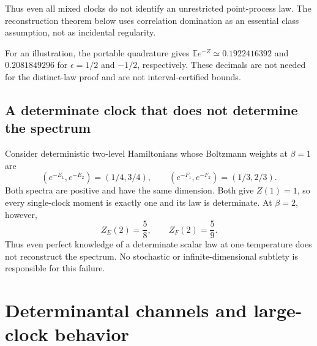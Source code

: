 \documentclass[11pt,a4paper]{article}
\theoremstyle{remark}\newtheorem{remark}[theorem]{Remark}
\newcommand{\E}{\mathbb E}
\begin{document}
Thus even all mixed clocks do not identify an unrestricted point-process law.
The reconstruction theorem below uses correlation domination as an essential class assumption, not as incidental regularity.

For an illustration, the portable quadrature gives $\E e^{-Z}\simeq0.1922416392$ and $0.2081849296$ for $\epsilon=1/2$ and $-1/2$, respectively.
These decimals are not needed for the distinct-law proof and are not interval-certified bounds.

\subsection{A determinate clock that does not determine the spectrum}
Consider deterministic two-level Hamiltonians whose Boltzmann weights at $\beta=1$ are
\begin{equation}
 (e^{-E_1},e^{-E_2})=(1/4,3/4),\qquad
 (e^{-F_1},e^{-F_2})=(1/3,2/3).
\end{equation}
Both spectra are positive and have the same dimension.
Both give $Z(1)=1$, so every single-clock moment is exactly one and its law is determinate.
At $\beta=2$, however,
\begin{equation}
 Z_E(2)=\frac58,\qquad Z_F(2)=\frac59.
\end{equation}
Thus even perfect knowledge of a determinate scalar law at one temperature does not reconstruct the spectrum.
No stochastic or infinite-dimensional subtlety is responsible for this failure.

\section{Determinantal channels and large-clock behavior}\label{sec:channels}
\end{document}
